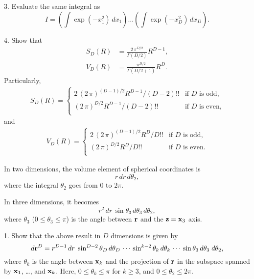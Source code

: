 \documentclass{book}
\begin{document}
3. Evaluate the same integral as
\[
  I
  =
\left( \int \exp(-x_1^2) \, d x_1 \right)
\dots
\left( \int \exp(-x_D^2) \, d x_D \right).
\]

4. Show that
\begin{align}
  S_D(R) &= \frac{ 2 \, \pi^{D/2} } { \Gamma(D/2) } R^{D-1},
  \label{eq:SD} \\
  V_D(R) &= \frac { \pi^{D/2} } { \Gamma(D/2+1) } R^D.
  \label{eq:VD}
\end{align}
%
Particularly,
\begin{align}
  S_D(R)
=
\begin{cases}
  2 \, (2 \, \pi)^{(D-1)/2} R^{D-1} / (D-2)!!  & \mbox{if $D$ is odd,} \\
       (2 \, \pi)^{D/2} R^{D-1} / (D-2)!!      & \mbox{if $D$ is even,} \\
\end{cases}
\label{eq:SDoe}
\end{align}
and
\begin{align}
  V_D(R)
=
\begin{cases}
  2 \, (2 \, \pi)^{(D-1)/2} R^D / D!!  & \mbox{if $D$ is odd,} \\
       (2 \, \pi)^{D/2} R^D / D!!      & \mbox{if $D$ is even.} \\
\end{cases}
\label{eq:VDoe}
\end{align}






In two dimensions, the volume element of spherical coordinates is
\[
  r \, dr \, d\theta_2,
\]
where the integral $\theta_2$ goes from $0$ to $2\pi$.

In three dimensions, it becomes
\[
  r^2 \, dr \,
  \sin \theta_3 \, d \theta_3 \,
  d \theta_2,
\]
where $\theta_3$ ($0 \le \theta_3 \le \pi$)
is the angle between $\boldsymbol{\mathbf{r}}$ and the $\boldsymbol{\mathbf{z}} = \boldsymbol{\mathbf{x}}_3$ axis.

1. Show that the above result in $D$ dimensions is given by
\begin{equation}
  d\boldsymbol{\mathbf{r}}^{D}
=
  r^{D-1} \, dr \;
  \sin^{D-2} \theta_D \, d \theta_D \,
  \cdots \,
  \sin^{k-2} \theta_k \, d \theta_k \,
  \cdots \,
  \sin \theta_3 \, d \theta_3 \;
  d \theta_2,
  \label{eq:sphrcoordiff}
\end{equation}
where $\theta_k$ is the angle between $\boldsymbol{\mathbf{x}}_k$ and
the projection of $\boldsymbol{\mathbf{r}}$ in the subspace
spanned by $\boldsymbol{\mathbf{x}}_1$, \dots, and $\boldsymbol{\mathbf{x}}_k$.
Here, $0 \le \theta_k \le \pi$ for $k \ge 3$,
and $0 \le \theta_2 \le 2\pi$.
\end{document}
